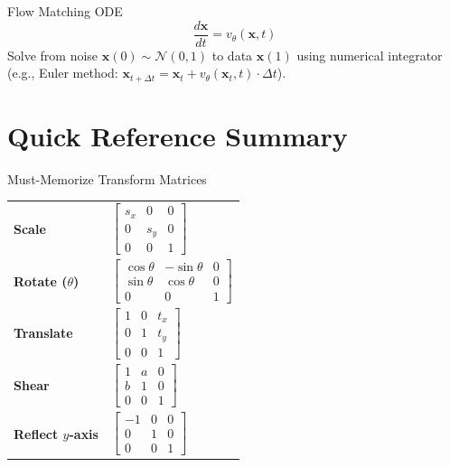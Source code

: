 \documentclass[11pt]{article}
\begin{document}
\begin{formulabox}{Flow Matching ODE}
$$\frac{d\mathbf{x}}{dt} = v_\theta(\mathbf{x}, t)$$
Solve from noise $\mathbf{x}(0) \sim \mathcal{N}(0, 1)$ to data $\mathbf{x}(1)$ using numerical integrator (e.g., Euler method: $\mathbf{x}_{t+\Delta t} = \mathbf{x}_t + v_\theta(\mathbf{x}_t, t) \cdot \Delta t$).
\end{formulabox}

\section{Quick Reference Summary}
\begin{formulabox}{Must-Memorize Transform Matrices}
\begin{tabular}{>{\bfseries}p{2.5cm} p{10cm}}
Scale & $\begin{bmatrix} s_x & 0 & 0 \\ 0 & s_y & 0 \\ 0 & 0 & 1 \end{bmatrix}$ \\[1em]
Rotate ($\theta$) & $\begin{bmatrix} \cos\theta & -\sin\theta & 0 \\ \sin\theta & \cos\theta & 0 \\ 0 & 0 & 1 \end{bmatrix}$ \\[1em]
Translate & $\begin{bmatrix} 1 & 0 & t_x \\ 0 & 1 & t_y \\ 0 & 0 & 1 \end{bmatrix}$ \\[1em]
Shear & $\begin{bmatrix} 1 & a & 0 \\ b & 1 & 0 \\ 0 & 0 & 1 \end{bmatrix}$ \\[1em]
Reflect $y$-axis & $\begin{bmatrix} -1 & 0 & 0 \\ 0 & 1 & 0 \\ 0 & 0 & 1 \end{bmatrix}$
\end{tabular}
\end{formulabox}
\end{document}
